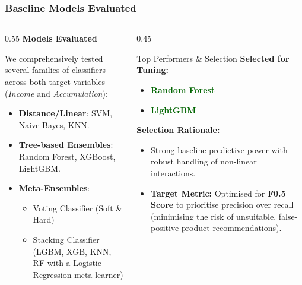 \documentclass[aspectratio=169]{beamer}
\begin{document}
\begin{frame}
\begin{center}
{
		}
	\end{center}
\end{frame}

\begin{frame}
	\frametitle{Baseline Models Evaluated}
	\begin{columns}[T]
		\begin{column}{0.55\textwidth}
			\textbf{Models Evaluated}

			We comprehensively tested several families of classifiers across both target variables (\textit{Income} and \textit{Accumulation}):

			\begin{itemize}
				\item \textbf{Distance/Linear}: SVM, Naive Bayes, KNN.
				\item \textbf{Tree-based Ensembles}: Random Forest, XGBoost, LightGBM.
				\item \textbf{Meta-Ensembles}:
				      \begin{itemize}
					      \item Voting Classifier (Soft \& Hard)
					      \item Stacking Classifier (LGBM, XGB, KNN, RF with a Logistic Regression meta-learner)
				      \end{itemize}
			\end{itemize}
		\end{column}

		\begin{column}{0.45\textwidth}
			\begin{block}{Top Performers \& Selection}
				\textbf{Selected for Tuning:}
				\begin{itemize}
					\item \textcolor{darkgreen}{\textbf{Random Forest}}
					\item \textcolor{darkgreen}{\textbf{LightGBM}}
				\end{itemize}

				\vspace{0.3cm}
				\textbf{Selection Rationale:}
				\begin{itemize}
					\item Strong baseline predictive power with robust handling of non-linear interactions.
					\item \textbf{Target Metric:} Optimised for \textbf{F0.5 Score} to prioritise precision over recall (minimising the risk of unsuitable, false-positive product recommendations).
				\end{itemize}
			\end{block}
		\end{column}
	\end{columns}
\end{frame}
\end{document}

